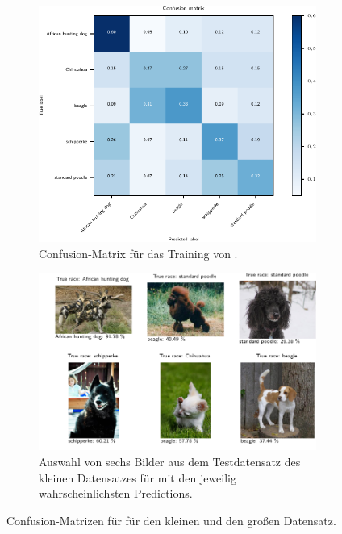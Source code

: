 \begin{figure}
  \begin{subfigure}{0.49\textwidth}
    \centering
    \includegraphics[width=\textwidth]{pics/ergebnisse/MiniDogNN/confusion_matrix}
    \caption{Confusion-Matrix für das Training von \MiniDog{}.}
    \label{fig:confusion-mini}
  \end{subfigure}
  \begin{subfigure}{0.49\textwidth}
    \centering
    \includegraphics[width=\textwidth]{pics/ergebnisse/MiniDogNN/visualize_predictions.pdf}
    \caption{Auswahl von sechs Bilder aus dem Testdatensatz des kleinen
    Datensatzes für \MiniDog{} mit den jeweilig wahrscheinlichsten Predictions.}
    \label{fig:visualize-pred}
  \end{subfigure}
  \caption{Confusion-Matrizen für \MiniDog{} für den kleinen und den großen Datensatz.}
  \label{fig:confusion-mini-gesamt}
\end{figure}

